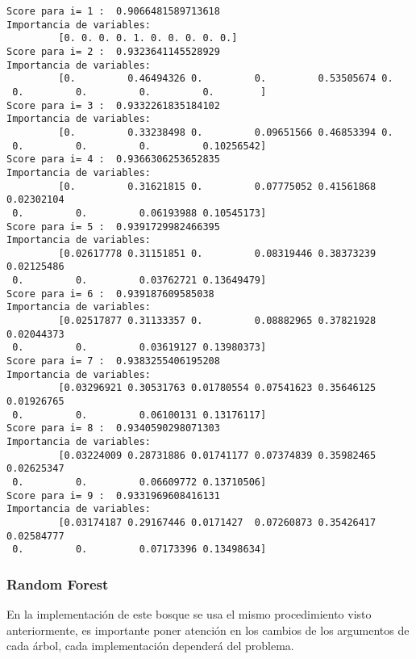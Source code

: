 \documentclass[12pt,a4paper,table]{article}
\begin{document}
    \begin{Verbatim}[commandchars=\\\{\}]
Score para i= 1 :  0.9066481589713618
Importancia de variables:
         [0. 0. 0. 0. 1. 0. 0. 0. 0. 0.]
Score para i= 2 :  0.9323641145528929
Importancia de variables:
         [0.         0.46494326 0.         0.         0.53505674 0.
 0.         0.         0.         0.        ]
Score para i= 3 :  0.9332261835184102
Importancia de variables:
         [0.         0.33238498 0.         0.09651566 0.46853394 0.
 0.         0.         0.         0.10256542]
Score para i= 4 :  0.9366306253652835
Importancia de variables:
         [0.         0.31621815 0.         0.07775052 0.41561868 0.02302104
 0.         0.         0.06193988 0.10545173]
Score para i= 5 :  0.9391729982466395
Importancia de variables:
         [0.02617778 0.31151851 0.         0.08319446 0.38373239 0.02125486
 0.         0.         0.03762721 0.13649479]
Score para i= 6 :  0.939187609585038
Importancia de variables:
         [0.02517877 0.31133357 0.         0.08882965 0.37821928 0.02044373
 0.         0.         0.03619127 0.13980373]
Score para i= 7 :  0.9383255406195208
Importancia de variables:
         [0.03296921 0.30531763 0.01780554 0.07541623 0.35646125 0.01926765
 0.         0.         0.06100131 0.13176117]
Score para i= 8 :  0.9340590298071303
Importancia de variables:
         [0.03224009 0.28731886 0.01741177 0.07374839 0.35982465 0.02625347
 0.         0.         0.06609772 0.13710506]
Score para i= 9 :  0.9331969608416131
Importancia de variables:
         [0.03174187 0.29167446 0.0171427  0.07260873 0.35426417 0.02584777
 0.         0.         0.07173396 0.13498634]
    \end{Verbatim}

    \hypertarget{random-forest}{%
\subsubsection*{Random Forest}\label{random-forest}}

En la implementación de este bosque se usa el mismo procedimiento visto
anteriormente, es importante poner atención en los cambios de los
argumentos de cada árbol, cada implementación dependerá del problema.
\end{document}
